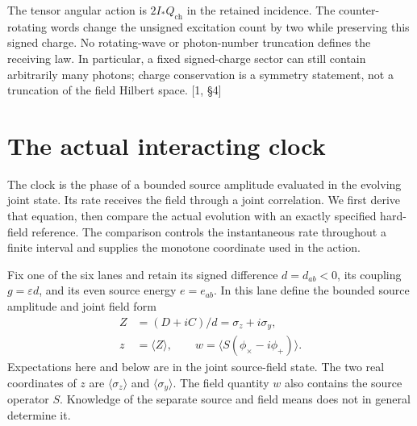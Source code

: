 \documentclass[10pt,twocolumn,letterpaper]{article}
\begin{document}
The tensor angular action is $2I_*Q_{\mathrm{ch}}$ in the retained
incidence.  The counter-rotating words change the unsigned excitation
count by two while preserving this signed charge. No rotating-wave or
photon-number truncation defines the receiving law.  In particular, a
fixed signed-charge sector can still contain arbitrarily many photons;
charge conservation is a symmetry statement, not a truncation of the
field Hilbert space. [1, \S4]


\section{The actual interacting clock}
The clock is the phase of a bounded source amplitude evaluated in the evolving joint state. Its rate receives the field through a joint correlation. We first derive that equation, then compare the actual evolution with an exactly specified hard-field reference. The comparison controls the instantaneous rate throughout a finite interval and supplies the monotone coordinate used in the action.

Fix one of the six lanes and retain its signed difference $d=d_{ab}<0$, its coupling $g=\varepsilon d$, and its even source energy $e=e_{ab}$. In this lane define the bounded source amplitude and joint field form
\begin{equation}
\begin{aligned}
Z&=(D+iC)/d=\sigma_z+i\sigma_y,\\
z&=\langle Z\rangle,\qquad w=\langle S(\phi_\times-i\phi_+)\rangle.
\end{aligned}\tag{21}\label{eq:clock-amplitude}
\end{equation}
Expectations here and below are in the joint source-field state. The two real coordinates of $z$ are $\langle\sigma_z\rangle$ and $\langle\sigma_y\rangle$. The field quantity $w$ also contains the source operator $S$. Knowledge of the separate source and field means does not in general determine it.
\end{document}
